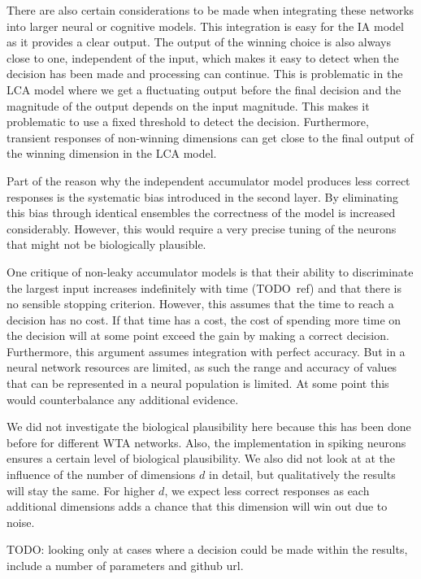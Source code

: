 \documentclass[10pt,letterpaper]{article}
\begin{document}
There are also certain considerations to be made when integrating these networks 
into larger neural or cognitive models. This integration is easy for the IA 
model as it provides a clear output. The output of the winning choice is also 
always close to one, independent of the input, which makes it easy to detect 
when the decision has been made and processing can continue. This is problematic 
in the LCA model where we get a fluctuating output before the final decision and 
the magnitude of the output depends on the input magnitude. This makes it 
problematic to use a fixed threshold to detect the decision. Furthermore, 
transient responses of non-winning dimensions can get close to the final output 
of the winning dimension in the LCA model.

Part of the reason why the independent accumulator model produces less correct 
responses is the systematic bias introduced in the second layer. By eliminating 
this bias through identical ensembles the correctness of the model is increased 
considerably. However, this would require a very precise tuning of the neurons 
that might not be biologically plausible.

One critique of non-leaky accumulator models is that their ability to 
discriminate the largest input increases indefinitely with time (TODO~ref) and 
that there is no sensible stopping criterion. However, this assumes that the 
time to reach a decision has no cost. If that time has a cost, the cost of 
spending more time on the decision will at some point exceed the gain by making 
a correct decision. Furthermore, this argument assumes integration with perfect 
accuracy. But in a neural network resources are limited, as such the range and 
accuracy of values that can be represented in a neural population is limited.  
At some point this would counterbalance any additional evidence.

We did not investigate the biological plausibility here because this has been 
done before for different WTA networks.  Also, the implementation in spiking 
neurons ensures a certain level of biological plausibility. We also did not look 
at at the influence of the number of dimensions $d$ in detail, but qualitatively 
the results will stay the same. For higher $d$, we expect less correct responses 
as each additional dimensions adds a chance that this dimension will win out due 
to noise.

TODO\@: looking only at cases where a decision could be made within the results, 
include a number of parameters and github url.
\end{document}
